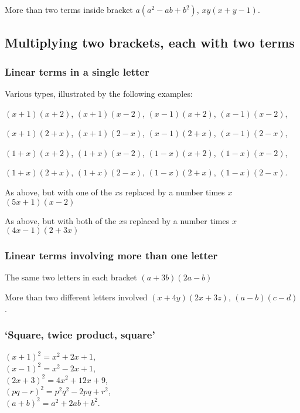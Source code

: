 \documentclass{article}
\begin{document}
More than two terms inside bracket \hfill \(a(a^2-ab+b^2)\), \(xy(x+y-1)\).

\subsection{Multiplying two brackets, each with two terms}

\subsubsection{Linear terms in a single letter}

Various types, illustrated by the following examples:

\begin{center}
\((x+1)(x+2)\), \((x+1)(x-2)\), \((x-1)(x+2)\), \((x-1)(x-2)\),

\((x+1)(2+x)\), \((x+1)(2-x)\), \((x-1)(2+x)\), \((x-1)(2-x)\),

\((1+x)(x+2)\), \((1+x)(x-2)\), \((1-x)(x+2)\), \((1-x)(x-2)\),

\((1+x)(2+x)\), \((1+x)(2-x)\), \((1-x)(2+x)\), \((1-x)(2-x)\).
\end{center}

As above, but with one of the \(x\)s replaced by a number times \(x\) \hfill \((5x + 1)(x - 2)\)

As above, but with both of the \(x\)s replaced by a number times \(x\) \hfill \((4x - 1)(2+ 3x)\)

\subsubsection{Linear terms involving more than one letter}

The same two letters in each bracket \hfill \((a+3b)(2a-b)\)

More than two different letters involved \hfill \((x+4y)(2x+3z)\), \((a-b)(c - d)\).

\subsubsection{\lq Square, twice product, square'}

\begin{flushright}
\((x+1)^2 = x^2+2x+1\), \\
\((x-1)^2 = x^2 - 2x +1\), \\
\((2x+3)^2 = 4x^2 + 12x + 9\), \\
\((pq-r)^2 = p^2q^2 - 2pq + r^2\), \\
\((a+b)^2 = a^2 + 2ab + b^2\).
\end{flushright}
\end{document}
